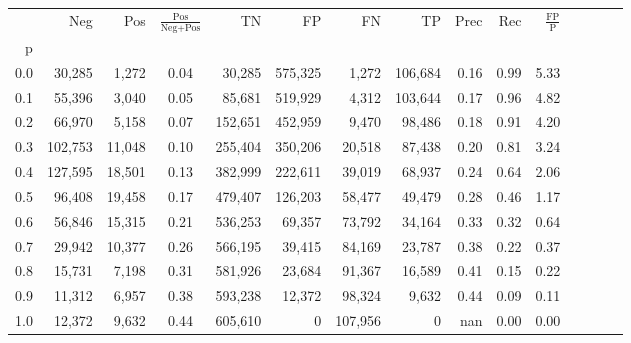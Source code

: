 \begin{tabular}{rrrcrrrrrrrrrrr}
\toprule
{} &      Neg &     Pos & $\frac{\text{Pos}}{\text{Neg}+\text{Pos}}$ &       TN &       FP &       FN &       TP &  Prec &   Rec & $\frac{\text{FP}}{\text{P}}$ \\
p   &          &         &                                            &          &          &          &          &       &       &                              \\
\midrule
0.0 &   30,285 &   1,272 &                                       0.04 &   30,285 &  575,325 &    1,272 &  106,684 &  0.16 &  0.99 &                         5.33 \\
0.1 &   55,396 &   3,040 &                                       0.05 &   85,681 &  519,929 &    4,312 &  103,644 &  0.17 &  0.96 &                         4.82 \\
0.2 &   66,970 &   5,158 &                                       0.07 &  152,651 &  452,959 &    9,470 &   98,486 &  0.18 &  0.91 &                         4.20 \\
0.3 &  102,753 &  11,048 &                                       0.10 &  255,404 &  350,206 &   20,518 &   87,438 &  0.20 &  0.81 &                         3.24 \\
0.4 &  127,595 &  18,501 &                                       0.13 &  382,999 &  222,611 &   39,019 &   68,937 &  0.24 &  0.64 &                         2.06 \\
0.5 &   96,408 &  19,458 &                                       0.17 &  479,407 &  126,203 &   58,477 &   49,479 &  0.28 &  0.46 &                         1.17 \\
0.6 &   56,846 &  15,315 &                                       0.21 &  536,253 &   69,357 &   73,792 &   34,164 &  0.33 &  0.32 &                         0.64 \\
0.7 &   29,942 &  10,377 &                                       0.26 &  566,195 &   39,415 &   84,169 &   23,787 &  0.38 &  0.22 &                         0.37 \\
0.8 &   15,731 &   7,198 &                                       0.31 &  581,926 &   23,684 &   91,367 &   16,589 &  0.41 &  0.15 &                         0.22 \\
0.9 &   11,312 &   6,957 &                                       0.38 &  593,238 &   12,372 &   98,324 &    9,632 &  0.44 &  0.09 &                         0.11 \\
1.0 &   12,372 &   9,632 &                                       0.44 &  605,610 &        0 &  107,956 &        0 &   nan &  0.00 &                         0.00 \\
\bottomrule
\end{tabular}
